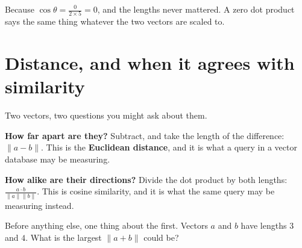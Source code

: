 \begin{fr}
Because $\cos\theta = \frac{0}{2 \times 5} = 0$, and the lengths never
mattered. A zero dot product says the same thing whatever the two vectors are
scaled to.
\end{fr}

\section{Distance, and when it agrees with similarity}
\label{sec:F09-distance}

\begin{fr}
Two vectors, two questions you might ask about them.

\textbf{How far apart are they?} Subtract, and take the length of the
difference: $\lVert a - b \rVert$. This is the \textbf{Euclidean distance},
and it is what a query in a vector database may be measuring.

\textbf{How alike are their directions?} Divide the dot product by both
lengths: $\frac{a \cdot b}{\lVert a \rVert \lVert b \rVert}$. This is cosine
similarity, and it is what the same query may be measuring instead.

Before anything else, one thing about the first. Vectors $a$ and $b$ have
lengths $3$ and $4$. What is the largest $\lVert a + b \rVert$ could be?
\nextframe
\end{fr}

